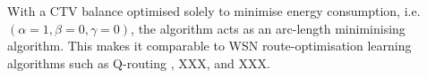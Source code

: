 
With a CTV balance optimised solely to minimise energy consumption, i.e. $(\alpha=1,\beta=0,\gamma=0)$, the \acronymWSNOptimisation{}{} algorithm acts as an arc-length miniminising algorithm. This makes it comparable to WSN route-optimisation learning algorithms such as Q-routing \cite{XXX}, XXX, and XXX. 

